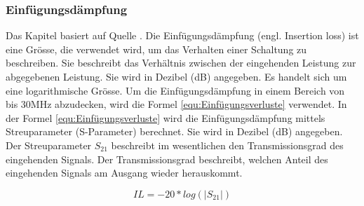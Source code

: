 \subsubsection{Einfügungsdämpfung}\label{subsec:einfuge}
Das Kapitel basiert auf Quelle \cite{hftech}. Die Einfügungsdämpfung (engl. Insertion loss) ist eine Grösse, die verwendet wird, um das Verhalten einer Schaltung zu beschreiben. Sie beschreibt das Verhältnis zwischen der eingehenden Leistung zur abgegebenen Leistung. Sie wird in Dezibel (dB) angegeben. Es handelt sich um eine logarithmische Grösse. Um die Einfügungsdämpfung in einem Bereich von bis 30MHz abzudecken, wird die Formel \ref{equ:Einfügungsverluste} verwendet. In der Formel \ref{equ:Einfügungsverluste} wird die Einfügungsdämpfung mittels Streuparameter (S-Parameter) berechnet. Sie wird in Dezibel (dB) angegeben. Der Streuparameter $S_{21}$ beschreibt im wesentlichen den Transmissionsgrad des eingehenden Signals. Der Transmissionsgrad beschreibt, welchen Anteil des eingehenden Signals am Ausgang wieder herauskommt.



\begin{equation}\label{equ:Einfügungsverluste}
	IL = -20*log (\left\lvert S_{21} \right\rvert)
\end{equation}

\newpage

